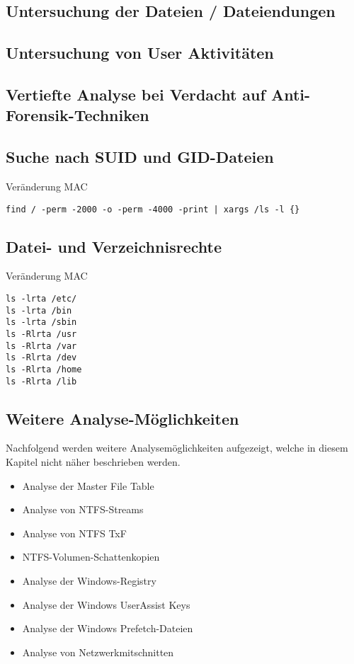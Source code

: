 \subsection{Untersuchung der Dateien / Dateiendungen}

\subsection{Untersuchung von User Aktivitäten}

\subsection{Vertiefte Analyse bei Verdacht auf Anti-Forensik-Techniken}

\subsection{Suche nach SUID und GID-Dateien}
Veränderung MAC
\begin{lstlisting}
find / -perm -2000 -o -perm -4000 -print | xargs /ls -l {}
\end{lstlisting}

\subsection{Datei- und Verzeichnisrechte}
Veränderung MAC
\begin{lstlisting}
ls -lrta /etc/
ls -lrta /bin
ls -lrta /sbin
ls -Rlrta /usr
ls -Rlrta /var
ls -Rlrta /dev
ls -Rlrta /home
ls -Rlrta /lib
\end{lstlisting}

\subsection{Weitere Analyse-Möglichkeiten}
Nachfolgend werden weitere Analysemöglichkeiten aufgezeigt, welche in diesem Kapitel nicht näher beschrieben werden.
\begin{itemize}
\item Analyse der Master File Table
\item Analyse von NTFS-Streams
\item Analyse von NTFS TxF
\item NTFS-Volumen-Schattenkopien
\item Analyse der Windows-Registry
\item Analyse der Windows UserAssist Keys
\item Analyse der Windows Prefetch-Dateien
\item Analyse von Netzwerkmitschnitten
\end{itemize}


